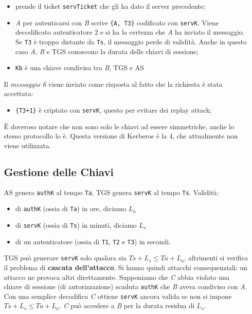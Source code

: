 \begin{itemize}
      \item prende il ticket \verb|servTicket| che gli ha dato il
            server precedente;
      \item \textit{A} per autenticarsi con \textit{B} scrive \verb|{A, T3}|
            codificato con \verb|servK|. Viene decodificato
            autenticatore 2 e si ha la certezza che \textit{A} ha inviato il
            messaggio. Se \verb|T3| è troppo distante da \verb|Ts|,
            il messaggio perde di validità. Anche in questo
            caso \textit{A}, \textit{B} e TGS conoscono la durata delle chiavi
            di sessione;
      \item \verb|Kb| è una chiave condivisa tra \textit{B}, TGS e AS
\end{itemize}

Il \textit{messaggio 6} viene inviato come risposta al fatto che la richiesta è
stata accettata:

\begin{itemize}
      \item \verb|{T3+1}| è criptato con \verb|servK|,
            questo per evitare dei replay attack;
\end{itemize}

È doveroso notare che non sono solo le chiavi ad essere simmetriche,
anche lo stesso protocollo lo è.
Questa versione di Kerberos è la 4, che attualmente non viene utilizzata.

\subsection{Gestione delle Chiavi}

AS genera \verb|authK| al tempo \verb|Ta|, TGS genera \verb|servK| al
tempo \verb|Ts|.
Validità:

\begin{itemize}
      \item di \verb|authK| (ossia di \verb|Ta|) in ore, diciamo \(L_a\)
      \item di \verb|servK| (ossia di \verb|Ts|) in minuti, diciamo \(L_s\)
      \item di un autenticatore (ossia di \verb|T1|, \verb|T2| e \verb|T3|) in
            secondi.
\end{itemize}

TGS può generare \verb|servK| solo qualora sia \(Ts + L_s \le Ta + L_a\),
altrimenti si verifica il problema di \textbf{cascata dell’attacco}. Si hanno
quindi attacchi consequenziali: un attacco ne provoca altri direttamente.
Supponiamo che \textit{C} abbia violato una chiave di sessione (di autorizzazione)
scaduta \verb|authK| che \textit{B} aveva condiviso con \textit{A}.
Con una semplice decodifica \textit{C} ottiene \verb|servK| ancora valida
se non si impone \(Ts + L_s \le Ta + L_a\). \textit{C} può accedere a \textit{B}
per la durata residua di \(L_s\).

